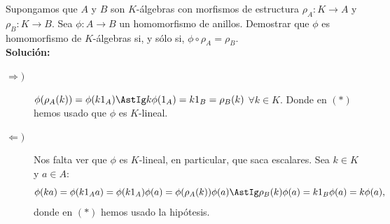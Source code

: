 \begin{ejercicio}
    Supongamos que $A$ y $B$ son $K$-álgebras con morfismos de estructura $\rho_A:K \to A$ y $\rho_B:K \to B$. Sea $\phi:A \to B$ un homomorfismo de anillos. Demostrar que $\phi $ es homomorfismo de $K$-álgebras si, y sólo si, $\phi \circ \rho_A = \rho_B$. \\

\noindent
\textbf{Solución:}
\begin{description}
    \item [$\Longrightarrow )$] $\phi(\rho_A(k)) = \phi(k1_A) \AstIg k\phi(1_A) = k1_B = \rho_B(k)$ $\forall k \in K$. 
    Donde en $(\ast)$ hemos usado que $\phi$ es $K$-lineal.
    \item [$\Longleftarrow )$] Nos falta ver que $\phi$ es $K$-lineal, en particular, que saca escalares. Sea $k \in K$ y $a \in A$:
        \begin{equation*}
            \phi(ka) = \phi(k1_Aa) = \phi(k1_A)\phi(a) = \phi(\rho_A(k))\phi(a) \AstIg \rho_B(k)\phi(a) = k1_B\phi(a) = k\phi(a),
        \end{equation*}
        donde en $(\ast)$ hemos usado la hipótesis.
\end{description}
\end{ejercicio}

